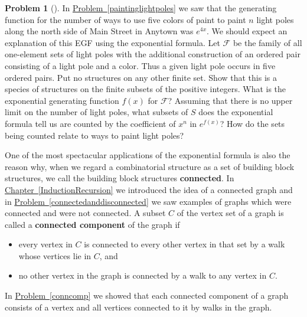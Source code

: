 \documentclass[10pt,]{book}
\newcommand{\terminology}[1]{\textbf{#1}}
\theoremstyle{plain}
\theoremstyle{definition}
\newtheorem{activity}[project]{Problem}
\theoremstyle{definition}
\numberwithin{equation}{chapter}
\newcommand{\F}{\mathcal{F}}
\begin{document}
\begin{activity}[] \label{activity-417}
\hypertarget{p-2187}{}%
In \hyperref[paintinglightpoles]{Problem~\ref{paintinglightpoles}} we saw that the generating function for the number of ways to use five colors of paint to paint \(n\) light poles along the north side of Main Street in Anytown was \(e^{4x}\). We should expect an explanation of this EGF using the exponential formula. Let \(\F\) be the family of all one-element sets of light poles with the additional construction of an ordered pair consisting of a light pole and a color. Thus a given light pole occurs in five ordered pairs. Put no structures on any other finite set. Show that this is a species of structures on the finite subsets of the positive integers. What is the exponential generating function \(f(x)\) for \(\F\)? Assuming that there is no upper limit on the number of light poles, what subsets of \(S\) does the exponential formula tell us are counted by the coefficient of \(x^n\) in \(e^{f(x)}\)? How do the sets being counted relate to ways to paint light poles?%
\end{activity}
\hypertarget{p-2189}{}%
One of the most spectacular applications of the exponential formula is also the reason why, when we regard a combinatorial structure as a set of building block structures, we call the building block structures \terminology{connected}. In \hyperref[InductionRecursion]{Chapter~\ref{InductionRecursion}} we introduced the idea of a connected graph and in \hyperref[connectedanddisconnected]{Problem~\ref{connectedanddisconnected}} we saw examples of graphs which were connected and were not connected. A subset \(C\) of the vertex set of a graph is called a \terminology{connected component} of the graph if \leavevmode%
\begin{itemize}[label=\textbullet]
\item{}\hypertarget{p-2190}{}%
every vertex in \(C\) is connected to every other vertex in that set by a walk whose vertices lie in \(C\), and%
\item{}\hypertarget{p-2191}{}%
no other vertex in the graph is connected by a walk to any vertex in \(C\).%
\end{itemize}
%
\par
\hypertarget{p-2192}{}%
In \hyperref[conncomp]{Problem~\ref{conncomp}} we showed that each connected component of a graph consists of a vertex and all vertices connected to it by walks in the graph.%
\end{document}
